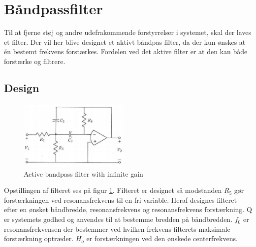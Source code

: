 \section{Båndpassfilter}\label{sec:filter}
Til at fjerne støj og andre udefrakommende forstyrrelser i systemet, skal der laves et filter.
Der vil her blive designet et aktivt båndpas filter, da der kun ønskes at én bestemt frekvens forstærkes.
Fordelen ved det aktive filter er at den kan både forstærke og filtrere.

\subsection{Design}
\begin{figure}
	\centering
	\includegraphics[width=0.48\textwidth]{billeder/ActiveFilter.png}
	\caption{Active bandpass filter with infinite gain \cite[Side. 208]{Huelsman1993}}
	\label{fig:ActiveFilter}
\end{figure}
Opstillingen af filteret ses på figur \ref{fig:ActiveFilter}.
Filteret er designet så modstanden $R_5$ gør forstærkningen ved resonansfrekvens til en fri variable.
Heraf designes filteret efter en ønsket båndbredde, resonansfrekvens og resonansfrekvens forstærkning. Q er systemets godhed og anvendes til at bestemme bredden på båndbredden. 
$f_0$ er resonansfrekvensen der bestemmer ved hvilken frekvens filterets maksimale forstærkning optræder.
$H_o$ er forstærkningen ved den ønskede centerfrekvens.
